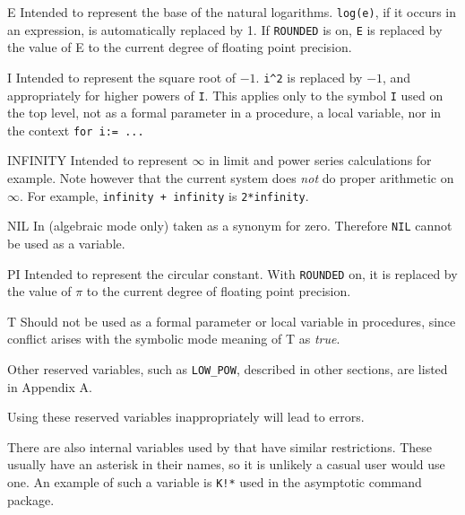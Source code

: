 \begin{list}{}{\renewcommand{\makelabel}[1]{{\tt#1}\hspace{\fill}}%
               \settowidth{\labelwidth}{\tt INFINITY}%
               \setlength{\labelsep}{1em}%
               }
\item[E] Intended to represent the base of
the natural logarithms.  {\tt log(e)}, if it occurs in an expression, is
automatically replaced by 1.  If {\tt ROUNDED} is
on, {\tt E} is replaced by the value of E to the current degree of
floating point precision.

\item[I] Intended to represent the square
root of $-1$. {\tt i\verb|^|2} is replaced by $-1$, and appropriately for higher
powers of {\tt I}.  This applies only to the symbol {\tt I} used on the top
level, not as a formal parameter in a procedure, a local variable, nor in
the context {\tt for i:= ...}

\item[INFINITY] Intended to represent $\infty$
in limit and power series calculations for example.  Note however that the
current system does {\em not\/} do proper arithmetic on $\infty$.  For example,
{\tt infinity + infinity} is {\tt 2*infinity}.

\item[NIL] In {\REDUCE} (algebraic mode only)
taken as a synonym for zero.  Therefore {\tt NIL} cannot be used as a
variable.

\item[PI] Intended to represent the circular
constant.  With {\tt ROUNDED} on, it is replaced by the value of $\pi$ to
the current degree of floating point precision.

\item[T] Should not be used as a formal
parameter or local variable in procedures, since conflict arises with the
symbolic mode meaning of T as {\em true}.
\end{list}

Other reserved variables, such as {\tt LOW\_POW}, described in other sections,
are listed in Appendix A.

Using these reserved variables inappropriately
will lead to errors.

There are also internal variables used by {\REDUCE} that have similar
restrictions. These usually have an asterisk in their names, so it is
unlikely a casual user would use one. An example of such a variable is
{\tt K!*} used in the asymptotic command package.

